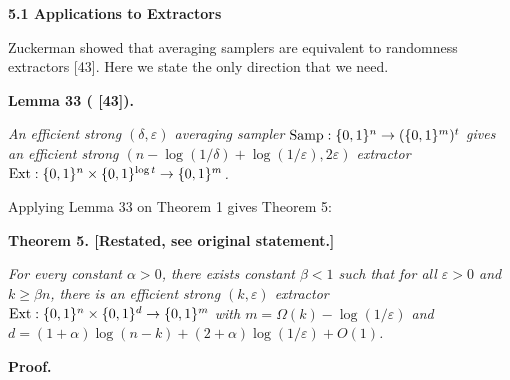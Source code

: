 \par\medskip\noindent\textbf{
5.1 Applications to Extractors}\par




Zuckerman showed that averaging samplers are equivalent to randomness extractors [43]. Here we state the only direction that we need.\par





\par\medskip\noindent\textbf{
\textbf{Lemma 33}\textbf{ }(
[43])\textbf{.}
}\par



\emph{An efficient strong $(\delta,\varepsilon)$ averaging sampler $\textup{{Samp}}:\{0,1\}^{n}\to(\{0,1\}^{m})^{t}$ gives an efficient strong $(n-\log(1/\delta)+\log(1/\varepsilon),2\varepsilon)$ extractor $\textup{{Ext}}:\{0,1\}^{n}\times\{0,1\}^{\log t}\to\{0,1\}^{m}$.}\par






Applying Lemma 33 on Theorem 1 gives Theorem 5:\par






\par\medskip\noindent\textbf{
\textbf{Theorem 5}\textbf{.}
[Restated, see original statement.]}\par



\emph{For every constant $\alpha>0$, there exists constant $\beta<1$ such that for all $\varepsilon>0$ and $k\geq\beta n$, there is an efficient strong $(k,\varepsilon)$ extractor $\textup{{Ext}}:\{0,1\}^{n}\times\{0,1\}^{d}\to\{0,1\}^{m}$ with $m=\Omega(k)-\log(1/\varepsilon)$ and $d=(1+\alpha)\log(n-k)+(2+\alpha)\log(1/\varepsilon)+O(1)$.}\par







\par\medskip\noindent\textbf{Proof.}\par




